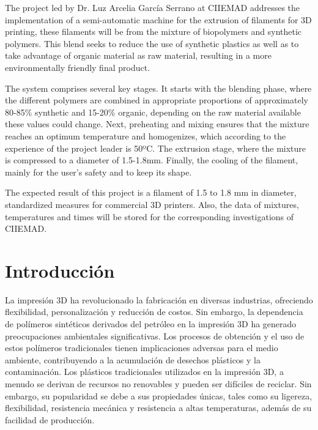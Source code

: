 \documentclass[14pt,oneside]{extarticle} %
\begin{document}
The project led by Dr. Luz Arcelia García Serrano at CIIEMAD addresses the implementation of a semi-automatic machine for the extrusion of filaments for 3D printing, these filaments will be from the mixture of biopolymers and synthetic polymers. This blend seeks to reduce the use of synthetic plastics as well as to take advantage of organic material as raw material, resulting in a more environmentally friendly final product.

The system comprises several key stages. It starts with the blending phase, where the different polymers are combined in appropriate proportions of approximately 80-85\% synthetic and 15-20\% organic, depending on the raw material available these values could change. Next, preheating and mixing ensures that the mixture reaches an optimum temperature and homogenizes, which according to the experience of the project leader is 50ºC. The extrusion stage, where the mixture is compressed to a diameter of 1.5-1.8mm. Finally, the cooling of the filament, mainly for the user's safety and to keep its shape.

The expected result of this project is a filament of 1.5 to 1.8 mm in diameter, standardized measures for commercial 3D printers. Also, the data of mixtures, temperatures and times will be stored for the corresponding investigations of CIIEMAD.

\newpage

\section{Introducción}

La impresión 3D ha revolucionado la fabricación en diversas industrias, ofreciendo flexibilidad, personalización y reducción de costos. Sin embargo, la dependencia de polímeros sintéticos derivados del petróleo en la impresión 3D ha generado preocupaciones ambientales significativas. Los procesos de obtención y el uso de estos polímeros tradicionales tienen implicaciones adversas para el medio ambiente, contribuyendo a la acumulación de desechos plásticos y la contaminación. Los plásticos tradicionales utilizados en la impresión 3D, a menudo se derivan de recursos no renovables y pueden ser difíciles de reciclar. Sin embargo, su popularidad se debe a sus propiedades únicas, tales como su ligereza, flexibilidad, resistencia mecánica y resistencia a altas temperaturas, además de su facilidad de producción. 
\end{document}
